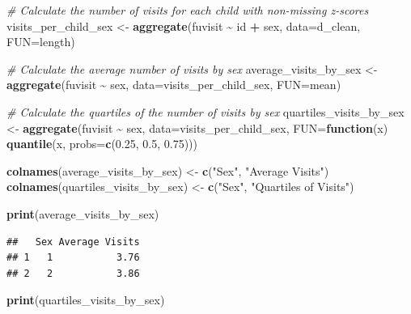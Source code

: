 \documentclass[
]{article}
\newenvironment{Shaded}{\begin{snugshade}}{\end{snugshade}}
\newcommand{\AttributeTok}[1]{\textcolor[rgb]{0.13,0.29,0.53}{#1}}
\newcommand{\CommentTok}[1]{\textcolor[rgb]{0.56,0.35,0.01}{\textit{#1}}}
\newcommand{\ControlFlowTok}[1]{\textcolor[rgb]{0.13,0.29,0.53}{\textbf{#1}}}
\newcommand{\FloatTok}[1]{\textcolor[rgb]{0.00,0.00,0.81}{#1}}
\newcommand{\FunctionTok}[1]{\textcolor[rgb]{0.13,0.29,0.53}{\textbf{#1}}}
\newcommand{\NormalTok}[1]{#1}
\newcommand{\OtherTok}[1]{\textcolor[rgb]{0.56,0.35,0.01}{#1}}
\newcommand{\SpecialCharTok}[1]{\textcolor[rgb]{0.81,0.36,0.00}{\textbf{#1}}}
\newcommand{\StringTok}[1]{\textcolor[rgb]{0.31,0.60,0.02}{#1}}
\begin{document}
\begin{Shaded}
\begin{Highlighting}[]
\CommentTok{\# Calculate the number of visits for each child with non{-}missing z{-}scores}
\NormalTok{visits\_per\_child\_sex }\OtherTok{\textless{}{-}} \FunctionTok{aggregate}\NormalTok{(fuvisit }\SpecialCharTok{\textasciitilde{}}\NormalTok{ id }\SpecialCharTok{+}\NormalTok{ sex, }\AttributeTok{data=}\NormalTok{d\_clean, }\AttributeTok{FUN=}\NormalTok{length)}

\CommentTok{\# Calculate the average number of visits by sex}
\NormalTok{average\_visits\_by\_sex }\OtherTok{\textless{}{-}} \FunctionTok{aggregate}\NormalTok{(fuvisit }\SpecialCharTok{\textasciitilde{}}\NormalTok{ sex, }\AttributeTok{data=}\NormalTok{visits\_per\_child\_sex, }\AttributeTok{FUN=}\NormalTok{mean)}

\CommentTok{\# Calculate the quartiles of the number of visits by sex}
\NormalTok{quartiles\_visits\_by\_sex }\OtherTok{\textless{}{-}} \FunctionTok{aggregate}\NormalTok{(fuvisit }\SpecialCharTok{\textasciitilde{}}\NormalTok{ sex, }\AttributeTok{data=}\NormalTok{visits\_per\_child\_sex, }\AttributeTok{FUN=}\ControlFlowTok{function}\NormalTok{(x) }\FunctionTok{quantile}\NormalTok{(x, }\AttributeTok{probs=}\FunctionTok{c}\NormalTok{(}\FloatTok{0.25}\NormalTok{, }\FloatTok{0.5}\NormalTok{, }\FloatTok{0.75}\NormalTok{)))}

\FunctionTok{colnames}\NormalTok{(average\_visits\_by\_sex) }\OtherTok{\textless{}{-}} \FunctionTok{c}\NormalTok{(}\StringTok{"Sex"}\NormalTok{, }\StringTok{"Average Visits"}\NormalTok{)}
\FunctionTok{colnames}\NormalTok{(quartiles\_visits\_by\_sex) }\OtherTok{\textless{}{-}} \FunctionTok{c}\NormalTok{(}\StringTok{"Sex"}\NormalTok{, }\StringTok{"Quartiles of Visits"}\NormalTok{)}

\FunctionTok{print}\NormalTok{(average\_visits\_by\_sex)}
\end{Highlighting}
\end{Shaded}

\begin{verbatim}
##   Sex Average Visits
## 1   1           3.76
## 2   2           3.86
\end{verbatim}

\begin{Shaded}
\begin{Highlighting}[]
\FunctionTok{print}\NormalTok{(quartiles\_visits\_by\_sex)}
\end{Highlighting}
\end{Shaded}
\end{document}
